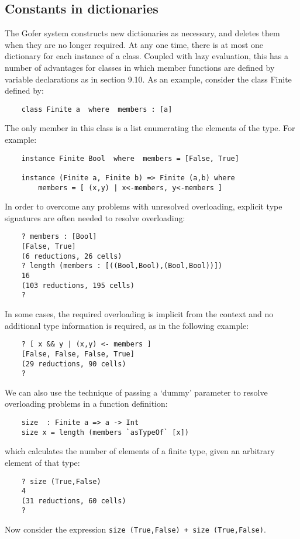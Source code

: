 \subsection{Constants in dictionaries}
The Gofer system constructs new dictionaries as necessary, and  deletes
them when they are no longer required.  At any one time,  there  is  at
most one dictionary for each instance of a class.   Coupled  with  lazy
evaluation, this has a number of advantages for classes in which member
functions are defined by variable declarations as in section 9.10.   As
an example, consider the class Finite defined by:
\begin{verbatim}
    class Finite a  where  members : [a]
\end{verbatim}
The only member in this class is a list enumerating the elements of the
type.  For example:
\begin{verbatim}
    instance Finite Bool  where  members = [False, True]
 
    instance (Finite a, Finite b) => Finite (a,b) where
        members = [ (x,y) | x<-members, y<-members ]
\end{verbatim}
In order to overcome any problems with unresolved overloading, explicit
type signatures are often needed to resolve overloading:
\begin{verbatim}
    ? members : [Bool]
    [False, True]
    (6 reductions, 26 cells)
    ? length (members : [((Bool,Bool),(Bool,Bool))])
    16
    (103 reductions, 195 cells)
    ?
\end{verbatim}
In some cases, the required overloading is implicit  from  the  context
and no additional type information is required,  as  in  the  following
example:
\begin{verbatim}
    ? [ x && y | (x,y) <- members ]
    [False, False, False, True]
    (29 reductions, 90 cells)
    ?
\end{verbatim}
We can also use the technique of passing a `dummy' parameter to resolve
overloading problems in a function definition:
\begin{verbatim}
    size  : Finite a => a -> Int
    size x = length (members `asTypeOf` [x])
\end{verbatim}
which calculates the number of elements of  a  finite  type,  given  an
arbitrary element of that type:
\begin{verbatim}
    ? size (True,False)
    4
    (31 reductions, 60 cells)
    ?
\end{verbatim}
Now consider the expression \verb"size (True,False) + size (True,False)".

